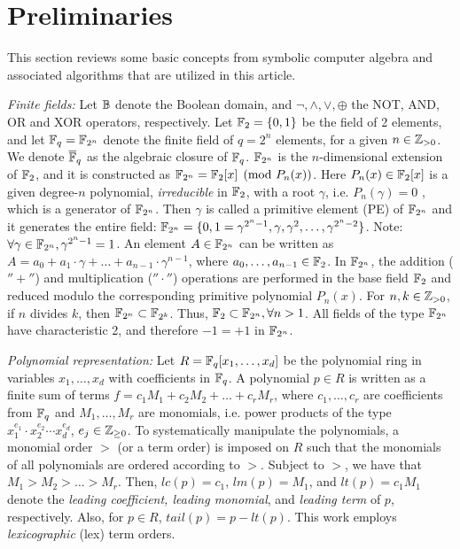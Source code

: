 \section{Preliminaries}
\label{sec:prelim}
This section reviews some basic concepts from symbolic computer
algebra and associated algorithms that are utilized in this article. 

{\it Finite fields:} Let ${\mathbb{B}}$ denote the Boolean domain, and $\neg,
\wedge,\vee, \oplus$ the NOT, AND, OR and XOR operators,
respectively. Let ${\mathbb{F}}_2=\{0,1\}$ be the field of 2 elements, and let
${\mathbb{F}}_q = {\mathbb{F}}_{2^n}$ denote the finite field of $q=2^n$ elements, for a
given $n\in {\mathbb{Z}}_{> 0}$. We denote $\overline{\mathbb{F}}_q$ as the algebraic closure of ${\mathbb{F}}_{q}$. 
${\mathbb{F}}_{2^n}$ is the $n$-dimensional extension of
${\mathbb{F}}_2$, and it is constructed as ${\mathbb{F}}_{2^n} = {\mathbb{F}}_2[x]\pmod{ P_n(x)}$. Here
$P_n(x) \in {\mathbb{F}}_2[x]$ is a given degree-$n$ polynomial, {\it
  irreducible} in ${\mathbb{F}}_2$, with a root $\gamma$, i.e.  $P_n(\gamma)=0$ 
 , which is a generator of
${\mathbb{F}}_{2^n}$. Then $\gamma$ is called a primitive element (PE) of ${\mathbb{F}}_{2^n}$ and
it generates the entire field: ${\mathbb{F}}_{2^n}=\{0,1=\gamma^{2^n - 1}, \gamma,
\gamma^2,\dots,\gamma^{2^n - 2}\}$. Note: $\forall \gamma\in {\mathbb{F}}_{2^n}, 
\gamma^{2^n-1}=1$.
An element $A \in {\mathbb{F}}_{2^n}$ can be written as $A = a_0 + a_1\cdot \gamma +
\dots + a_{n-1}\cdot\gamma^{n-1}$, where $a_0,\dots,a_{n-1} \in
{\mathbb{F}}_2$. 
In ${\mathbb{F}}_{2^n}$, the addition ($''+''$) and multiplication
($''\cdot''$) operations are performed in the base field ${\mathbb{F}}_2$ and
reduced modulo the corresponding primitive polynomial $P_n(x)$. For
$n, k \in {\mathbb{Z}}_{> 0}$, if $n$ divides $k$, then ${\mathbb{F}}_{2^n} \subset
{\mathbb{F}}_{2^k}$.
Thus, ${\mathbb{F}}_2 \subset {\mathbb{F}}_{2^n}, \forall n>1$. 
All fields of the type
${\mathbb{F}}_{2^n}$ have characteristic 2, and therefore $-1 = +1$ in ${\mathbb{F}}_{2^n}$. 


{\it Polynomial representation:} Let $R={\mathbb{F}}_q[x_1,\dots,x_d]$ be the
polynomial ring in variables $x_1,\dots,x_d$ with coefficients in
${\mathbb{F}}_q$. A polynomial $p \in R$ is 
written as a finite sum of terms  $f = c_1 M_1 +  c_2 M_2 + \dots +
c_r M_r$, where $c_1, \dots, c_r$ are coefficients from ${\mathbb{F}}_q$ and
$M_1, \dots, M_r$ are monomials, i.e. power products of the type
$x_1^{e_{1}}\cdot x_2^{e_{2}}\cdots x_d^{e_{d}}$,  $e_j \in {\mathbb{Z}}_{\geq  0}$. 
 To systematically manipulate the polynomials, a monomial order $>$ (or
a term order) is imposed on $R$ such that the monomials of all
polynomials are ordered according to $>$. 
Subject to $>$, we have that $M_1 >M_2 > \dots > M_r$. Then, $lc(p) = c_1$, $lm(p) =
M_1$, and $lt(p) = c_1 M_1$ denote the {\it leading coefficient, leading monomial}, 
and {\it leading   term} of $p$, respectively. 
 Also, for $p\in R$, $tail(p) = p - lt(p)$.
This work employs {\it lexicographic} (lex) term orders.  

